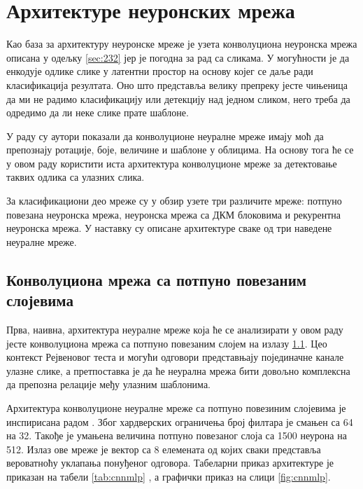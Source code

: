 \documentclass[a4paper, 12pt, master, utf8]{etf}
\begin{document}
\section{Архитектуре неуронских мрежа}
\label{sec:41}
Као база за архитектуру неуронске мреже је узета конволуциона неуронска мрежа описана у одељку \ref{sec:232} јер је погодна за рад са сликама. У могућности је да енкодује одлике слике 
у латентни простор на основу којег се даље ради класификација резултата. Оно што представља велику препреку јесте чињеница да ми не радимо класификацију или детекцију над једном сликом, него 
треба да одредимо да ли неке слике прате шаблоне. 
\newline

У раду \cite{hoshen_iq_2017} су аутори показали да конволуционе неуралне мреже имају моћ да препознају ротације, боје, величине и шаблоне 
у облицима. На основу тога ће се у овом раду користити иста архитектура конволуционе мреже за детектовање таквих одлика са улазних слика.
\newline

За класификациони део мреже су у обзир узете три различите мреже: потпуно повезана неуронска мрежа, неуронска мрежа са ДКМ блоковима и рекурентна неуронска мрежа. У наставку су описане архитектуре сваке од три наведене неуралне мреже.
\newline

\subsection{Конволуциона мрежа са потпуно повезаним слојевима}
\label{sec:411}

Прва, наивна, архитектура неуралне мреже која ће се анализирати у овом раду јесте конволуциона мрежа са потпуно повезаним слојем на излазу \ref{sec:411}. Цео контекст Рејвеновог теста и могући одговори представњају појединачне канале улазне слике, 
а претпоставка је да ће неурална мрежа бити довољно комплексна да препозна релације међу улазним шаблонима.

Архитектура конволуционе неуралне мреже са потпуно повезиним слојевима је инспирисана радом \cite{barrett_measuring_2018}.
Због хардверских ограничења број филтара је смањен са 64 на 32. Такође је умањена величина потпуно повезаног слоја са 1500 неурона на 512.
Излаз ове мреже је вектор са 8 елемената од којих сваки представља вероватноћу уклапања понуђеног одговора. Табеларни приказ архитектуре је 
приказан на табели \ref{tab:cnnmlp} , а графички приказ на слици \ref{fig:cnnmlp}.
\end{document}
